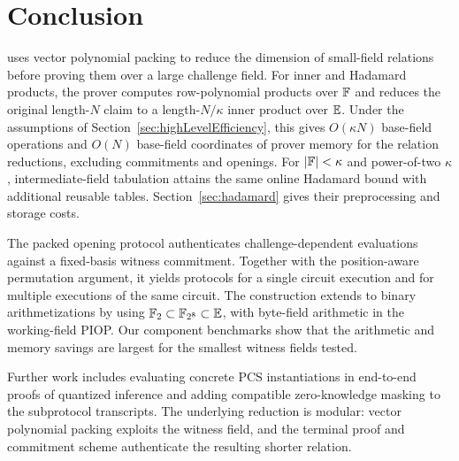 \section{Conclusion}
\label{sec:conclusion}

\methodname uses vector polynomial packing to reduce the dimension of
small-field relations before proving them over a large challenge
field. For inner and Hadamard products, the prover computes
row-polynomial products over \({\mathbb{F}}\) and reduces the original
length-\(N\) claim to a length-\(N/\kappa\) inner product over
\(\mathbb{E}\).
Under the assumptions of Section~\ref{sec:highLevelEfficiency},
this gives \(O(\kappa N)\) base-field operations and \(O(N)\)
base-field coordinates of prover memory for the relation
reductions, excluding commitments and openings.
For \(|{\mathbb{F}}|<\kappa\) and power-of-two \(\kappa\),
intermediate-field tabulation attains the same online Hadamard
bound with additional reusable tables. Section~\ref{sec:hadamard}
gives their preprocessing and storage costs.

The packed opening protocol authenticates challenge-dependent
evaluations against a fixed-basis witness commitment.
Together with the position-aware permutation argument, it yields
protocols for a single circuit execution and for multiple
executions of the same circuit.
The construction extends to binary arithmetizations by using
\(\mathbb F_2\subset\mathbb F_{2^8}\subset\mathbb{E}\),
with byte-field arithmetic in the working-field PIOP.
Our component benchmarks show that the arithmetic and memory
savings are largest for the smallest witness fields tested.

Further work includes evaluating concrete PCS instantiations in
end-to-end proofs of quantized inference and adding compatible
zero-knowledge masking to the subprotocol transcripts.
The underlying reduction is modular: vector polynomial packing exploits
the witness field, and the terminal proof and commitment scheme
authenticate the resulting shorter relation.
